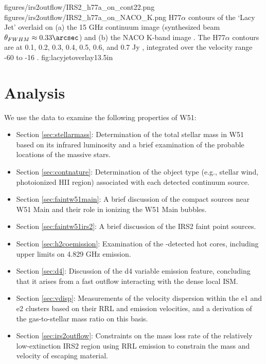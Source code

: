 \FigureTwo
{figures/irs2outflow/IRS2_h77a_on_cont22.png} %
{figures/irs2outflow/IRS2_h77a_on_NACO_K.png} %
{H77$\alpha$ contours of the `Lacy Jet' overlaid on (a) the 15 GHz
continuum image (synthesized beam $\theta_{FWHM}\approx0.33\arcsec$) and (b)
the NACO K-band image \citep[resolution $\approx0.2\arcsec$][]{Barbosa2008a}.
The H77$\alpha$ contours are at 0.1, 0.2, 0.3, 0.4, 0.5, 0.6, and 0.7 Jy \kms,
integrated over the velocity range -60 to -16 \kms.}
{fig:lacyjetoverlay}{1}{3.5in}

\section{Analysis}
\label{sec:analysis}
We use the data to examine the following properties of W51:
\begin{itemize}
    \item Section \ref{sec:stellarmass}: Determination of the total stellar
        mass in W51 based on its infrared luminosity and a brief examination
        of the probable locations of the massive stars.
    \item Section \ref{sec:contnature}: Determination of the object type
        (e.g., stellar wind, photoionized HII region) associated with each
        detected continuum source.
    \item Section \ref{sec:faintw51main}: A brief discussion of the compact
        sources near W51 Main and their role in ionizing the W51 Main bubbles.
    \item Section \ref{sec:faintw51irs2}: A brief discussion of the IRS2 faint
        point sources.
    \item Section \ref{sec:h2coemission}: Examination of the \ortho
        \twotwo-detected hot cores, including upper limits on 4.829 GHz \ortho
        \oneone emission.
    \item Section \ref{sec:d4}: Discussion of the d4 variable emission
        feature, concluding that it arises from a fast outflow interacting with
        the dense local ISM.
    \item Section \ref{sec:vdisp}: Measurements of the velocity dispersion
        within the e1 and e2 clusters based on their RRL and \formaldehyde
        emission velocities, and a derivation of the gas-to-stellar mass ratio
        on this basis.
    \item Section \ref{sec:irs2outflow}: Constraints on the mass loss rate of the
        relatively low-extinction IRS2 region using RRL emission to constrain
        the mass and velocity of escaping material.
\end{itemize}

